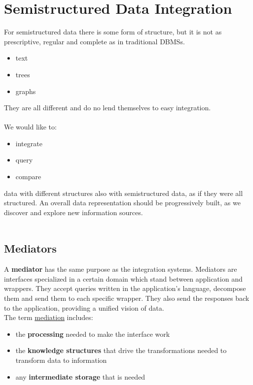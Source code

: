 \documentclass[10pt,a4paper]{article}
\newcommand{\nline}{\\~\\}
\begin{document}
\section{Semistructured Data Integration}
For semistructured data there is some form of structure, but it is not as prescriptive, regular and complete as in traditional DBMSs.
\begin{itemize}
	\item text
	\item trees
	\item graphs
\end{itemize}
They are all different and do no lend themselves to easy integration. \nline
We would like to:
\begin{itemize}
	\item integrate
	\item query
	\item compare
\end{itemize}
data with different structures also with semistructured data, as if they were all structured. An overall data representation should be progressively built, as we discover and explore new information sources. \nline
\subsection{Mediators}
A \textbf{mediator} has the same purpose as the integration systems. Mediators are interfaces specialized in a certain domain which stand between application and wrappers. They accept queries written in the application’s language, decompose them and send them to each specific wrapper. They also send the responses back to the application, providing a unified vision of data.
\\
The term \uline{mediation} includes:
\begin{itemize}
	\item the \textbf{processing} needed to make the interface work
	\item the \textbf{knowledge structures} that drive the transformations needed to transform data to information
	\item any \textbf{intermediate storage} that is needed
\end{itemize}
\end{document}
